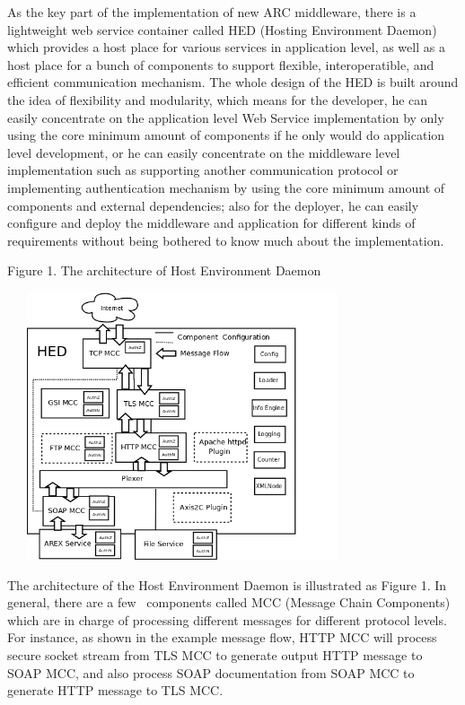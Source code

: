 \documentclass{article}
\begin{document}
As the key part of the implementation of new ARC middleware, there is a
lightweight web service container called HED (Hosting Environment
Daemon) which provides a host place for various services in application
level, as well as a host place for a bunch of components to support
flexible, interoperatible, and efficient communication mechanism. The
whole design of the HED is built around the idea of flexibility and
modularity, which means for the developer, he can easily concentrate on
the application level Web Service implementation by only using the core
minimum amount of components if he only would do application level
development, or he can easily concentrate on the middleware level
implementation such as supporting another communication protocol or
implementing authentication mechanism by using the core minimum amount
of components and external dependencies; also for the deployer, he can
easily configure and deploy the middleware and application for
different kinds of requirements without being bothered to know much
about the implementation.

{\centering
Figure 1. The architecture of Host Environment Daemon
\par}

\begin{center}
\includegraphics[width=4.0673in,height=3.1047in]{Secpaper-img1.png}
\end{center}
The architecture of the Host Environment Daemon is illustrated as Figure
1. In general, there are a few \ components called MCC (Message Chain
Components) which are in charge of processing different messages for
different protocol levels. For instance, as shown in the example
message flow, HTTP MCC will process secure socket stream from TLS MCC
to generate output HTTP message to SOAP MCC, and also process SOAP
documentation from SOAP MCC to generate HTTP message to TLS MCC. 
\end{document}
